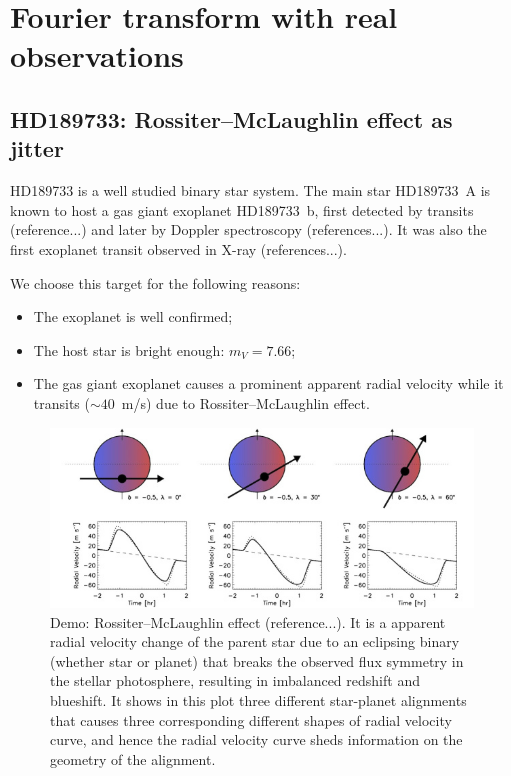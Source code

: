 \section{Fourier transform with real observations}
\label{\thesection}
\label{sec:observation}

\subsection{HD189733: Rossiter–McLaughlin effect as jitter}
\label{sec:HD189733}

HD189733 is a well studied binary star system. The main star HD189733~A is known to host a gas giant
exoplanet HD189733~b, first detected by transits (reference...) and later by Doppler spectroscopy (references...). 
It was also the first exoplanet transit observed in X-ray (references...). 

We choose this target for the following reasons:
\begin{itemize}
	\item The exoplanet is well confirmed;
	\item The host star is bright enough: $m_V=7.66$;
	\item The gas giant exoplanet causes a prominent apparent radial velocity while it transits ($\sim 40$~m/s)
	due to Rossiter–McLaughlin effect.
\end{itemize}

\begin{figure}[tbp]
\centering
\includegraphics[width = 0.80 \linewidth]
{./Figures/Methods/rmeffect.jpg}
\caption[Demo: Rossiter–McLaughlin effect]
{Demo: Rossiter–McLaughlin effect (reference...). It is a apparent radial velocity
	change of the parent star due to an eclipsing binary (whether star or planet) that breaks the observed flux symmetry in the 
	stellar photosphere, resulting in imbalanced redshift and blueshift. It shows in this plot three different star-planet 
	alignments that causes three corresponding different shapes of radial velocity curve, and hence the radial velocity curve
	sheds information on the geometry of the alignment.}
\label{fig:rm-effect}
\end{figure} 

